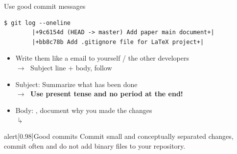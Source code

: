 \documentclass[usenames,svgnames,14pt]{beamer}
\begin{document}
\begin{frame}[fragile]{Use good commit messages}
    \begin{lstlisting}[style=MyBash]
        $ git log --oneline
        |+9c6154d (HEAD -> master) Add paper main document+|
        |+bb8c78b Add .gitignore file for LaTeX project+|
    \end{lstlisting}
    \begin{itemize}
        \item Write them like a email to yourself / the other developers\\
              $\to\;$ Subject line + body, follow  
        \item Subject: Summarize what has been done\\
              $\to\;$ \alert{\textbf{Use present tense and no period at the end!}}
        \item Body: , document why you made the changes\\[-0.5ex]
              \phantom{Bo}$\drsh$
    \end{itemize}
    \begin{varblock}{alert}[0.98\textwidth]{Good commits}
        Commit small and conceptually separated changes, commit often and do not add binary files to your repository.
    \end{varblock}
\end{frame}
\end{document}
